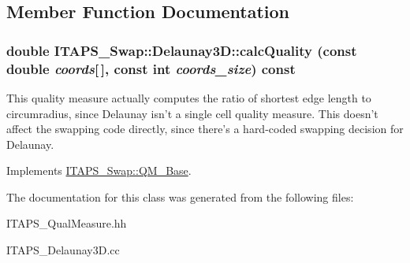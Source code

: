 \subsection{Member Function Documentation}
\hypertarget{class_i_t_a_p_s___swap_1_1_delaunay3_d_a5d045c523425ea05cdc4df77a4df61ce}{
\subsubsection[{calcQuality}]{\setlength{\rightskip}{0pt plus 5cm}double ITAPS\_\-Swap::Delaunay3D::calcQuality (const double {\em coords}\mbox{[}$\,$\mbox{]}, \/  const int {\em coords\_\-size}) const}}
\label{class_i_t_a_p_s___swap_1_1_delaunay3_d_a5d045c523425ea05cdc4df77a4df61ce}
This quality measure actually computes the ratio of shortest edge length to circumradius, since Delaunay isn't a single cell quality measure. This doesn't affect the swapping code directly, since there's a hard-\/coded swapping decision for Delaunay. 

Implements \hyperlink{class_i_t_a_p_s___swap_1_1_q_m___base_aea047b3afc06b75a1115bbaddd8286ee}{ITAPS\_\-Swap::QM\_\-Base}.



The documentation for this class was generated from the following files:\begin{DoxyCompactItemize}
\item 
ITAPS\_\-QualMeasure.hh\item 
ITAPS\_\-Delaunay3D.cc\end{DoxyCompactItemize}
